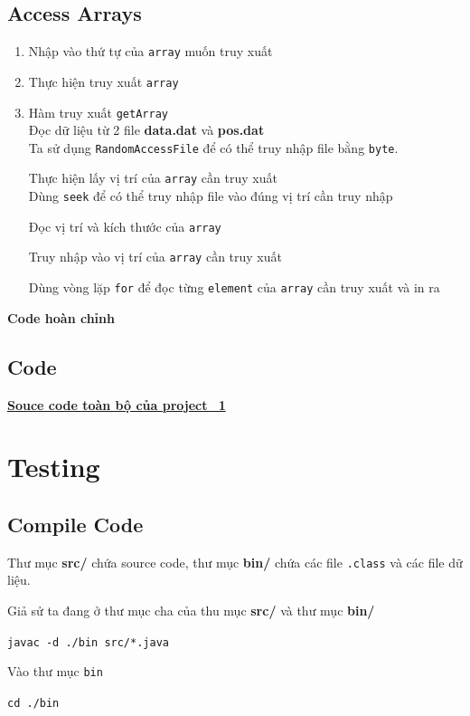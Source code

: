 \documentclass[a4paper]{article}
\theoremstyle{definition}
\begin{document}
\subsection{Access Arrays}
\begin{enumerate}[1.]
  \item Nhập vào thứ tự của \texttt{array} muốn truy xuất
  
  \item Thực hiện truy xuất \texttt{array}
  
  \item Hàm truy xuất \texttt{getArray}\\
  Đọc dữ liệu từ 2 file \textbf{data.dat} và \textbf{pos.dat}\\
  Ta sử dụng \texttt{RandomAccessFile} để có thể truy nhập file bằng \texttt{byte}.
  
  Thực hiện lấy vị trí của \texttt{array} cần truy xuất\\
  Dùng \texttt{seek} để có thể truy nhập file vào đúng vị trí cần truy nhập
  
  Đọc vị trí và kích thước của \texttt{array}
  
  Truy nhập vào vị trí của \texttt{array} cần truy xuất
  
  Dùng vòng lặp \texttt{for} để đọc từng \texttt{element} của \texttt{array} cần truy xuất và in ra
  
\end{enumerate}
\textbf{Code hoàn chỉnh}
  

\subsection{Code}
\textbf{\href{https://github.com/hmanhng/Project_1}{Souce code toàn bộ của project_1}}

\section{Testing}
\subsection{Compile Code}
\item Thư mục \textbf{src/} chứa source code, thư mục \textbf{bin/} chứa các file \texttt{.class} và các file dữ liệu.
\item Giả sử ta đang ở thư mục cha của thu mục \textbf{src/} và thư mục \textbf{bin/}
\begin{mdframed}[backgroundcolor=backcolour, linecolor=backcolour]
  \texttt{javac -d ./bin src/*.java}
\end{mdframed}
Vào thư mục \texttt{bin}
\begin{mdframed}[backgroundcolor=backcolour, linecolor=backcolour]
  \texttt{cd ./bin}
\end{mdframed}
\end{document}
